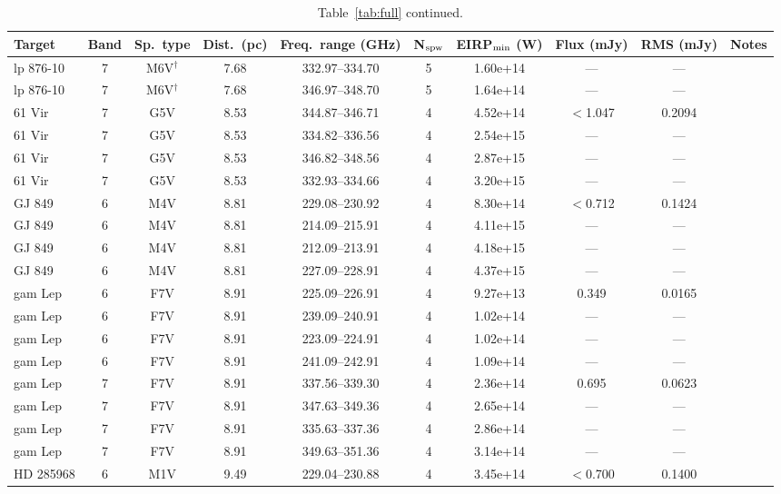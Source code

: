 \documentclass{openjournal}
\begin{document}
\begin{table}
\centering
\scriptsize
\caption{Table~\ref{tab:full} continued.}
\label{tab:full2}
\begin{tabularx}{\textwidth}{@{}l c c c c c c c c X@{}}
\hline
Target & Band & Sp.\ type & Dist.\ (pc) & Freq.\ range (GHz) & N$_{\rm spw}$ & EIRP$_{\rm min}$ (W) & Flux (mJy) & RMS (mJy) & Notes \\
\hline
lp 876-10 & 7 & M6V$^\dagger$ & 7.68 & 332.97--334.70 & 5 & 1.60e+14 & --- & --- &  \\
lp 876-10 & 7 & M6V$^\dagger$ & 7.68 & 346.97--348.70 & 5 & 1.64e+14 & --- & --- &  \\
61 Vir & 7 & G5V & 8.53 & 344.87--346.71 & 4 & 4.52e+14 & $<$1.047 & 0.2094 &  \\
61 Vir & 7 & G5V & 8.53 & 334.82--336.56 & 4 & 2.54e+15 & --- & --- &  \\
61 Vir & 7 & G5V & 8.53 & 346.82--348.56 & 4 & 2.87e+15 & --- & --- &  \\
61 Vir & 7 & G5V & 8.53 & 332.93--334.66 & 4 & 3.20e+15 & --- & --- &  \\
GJ 849 & 6 & M4V & 8.81 & 229.08--230.92 & 4 & 8.30e+14 & $<$0.712 & 0.1424 &  \\
GJ 849 & 6 & M4V & 8.81 & 214.09--215.91 & 4 & 4.11e+15 & --- & --- &  \\
GJ 849 & 6 & M4V & 8.81 & 212.09--213.91 & 4 & 4.18e+15 & --- & --- &  \\
GJ 849 & 6 & M4V & 8.81 & 227.09--228.91 & 4 & 4.37e+15 & --- & --- &  \\
gam Lep & 6 & F7V & 8.91 & 225.09--226.91 & 4 & 9.27e+13 & 0.349 & 0.0165 &  \\
gam Lep & 6 & F7V & 8.91 & 239.09--240.91 & 4 & 1.02e+14 & --- & --- &  \\
gam Lep & 6 & F7V & 8.91 & 223.09--224.91 & 4 & 1.02e+14 & --- & --- &  \\
gam Lep & 6 & F7V & 8.91 & 241.09--242.91 & 4 & 1.09e+14 & --- & --- &  \\
gam Lep & 7 & F7V & 8.91 & 337.56--339.30 & 4 & 2.36e+14 & 0.695 & 0.0623 &  \\
gam Lep & 7 & F7V & 8.91 & 347.63--349.36 & 4 & 2.65e+14 & --- & --- &  \\
gam Lep & 7 & F7V & 8.91 & 335.63--337.36 & 4 & 2.86e+14 & --- & --- &  \\
gam Lep & 7 & F7V & 8.91 & 349.63--351.36 & 4 & 3.14e+14 & --- & --- &  \\
HD 285968 & 6 & M1V & 9.49 & 229.04--230.88 & 4 & 3.45e+14 & $<$0.700 & 0.1400 &  \\

\end{tabularx}
\end{table}
\end{document}
